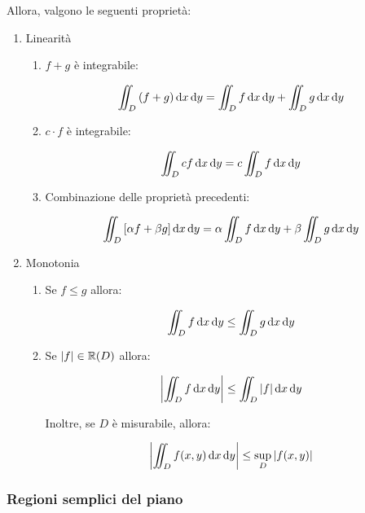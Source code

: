 Allora, valgono le seguenti proprietà:
\begin{enumerate}
    \item Linearità
          \begin{enumerate}
              \item \(f+g\) è integrabile:

                    \[
                        \iint_D {(f+g)} \mathop{}\!\mathrm{d}{x}\mathop{}\!\mathrm{d}{y}  = \iint_D f \mathop{}\!\mathrm{d}{x}\mathop{}\!\mathrm{d}{y} + \iint_D g \mathop{}\!\mathrm{d}{x}\mathop{}\!\mathrm{d}{y}
                    \]
              \item \(c\cdot f\) è integrabile:

                    \[
                        \iint_D {c f} \mathop{}\!\mathrm{d}{x}\mathop{}\!\mathrm{d}{y} = c \iint_D f \mathop{}\!\mathrm{d}{x}\mathop{}\!\mathrm{d}{y}
                    \]

              \item Combinazione delle proprietà precedenti:

                    \[
                        \iint_D {[\alpha f + \beta g ]} \mathop{}\!\mathrm{d}{x}\mathop{}\!\mathrm{d}{y} = \alpha \iint_D f \mathop{}\!\mathrm{d}{x}\mathop{}\!\mathrm{d}{y} + \beta \iint_D g \mathop{}\!\mathrm{d}{x}\mathop{}\!\mathrm{d}{y}
                    \]
          \end{enumerate}

    \item Monotonia
          \begin{enumerate}
              \item Se \(f \le g\) allora:

                    \[
                        \iint_D f \mathop{}\!\mathrm{d}{x}\mathop{}\!\mathrm{d}{y} \le \iint_D g \mathop{}\!\mathrm{d}{x}\mathop{}\!\mathrm{d}{y}
                    \]
              \item Se \(|f| \in \mathbb{R}(D)\) allora:

                    \[
                        \left|\iint_D f \mathop{}\!\mathrm{d}{x}\mathop{}\!\mathrm{d}{y} \right| \le \iint_D |f| \mathop{}\!\mathrm{d}{x}\mathop{}\!\mathrm{d}{y}
                    \]

                    Inoltre, se \(D\) è misurabile, allora:

                    \[
                        \left|\iint_D f(x,y) \mathop{}\!\mathrm{d}{x}\mathop{}\!\mathrm{d}{y}\right| \le \underset{D}{\sup} \left| f(x,y) \right|
                    \]
          \end{enumerate}
\end{enumerate}

\pagebreak
\subsubsection{Regioni semplici del piano}

